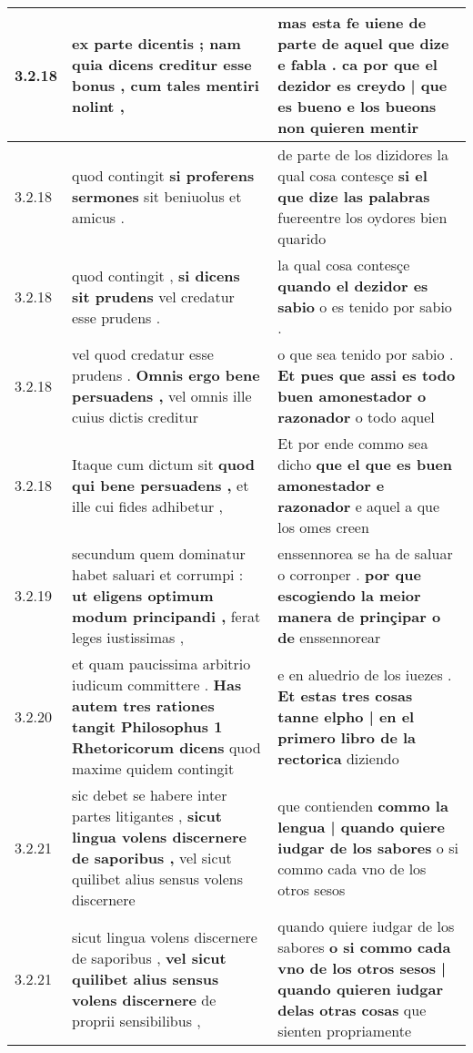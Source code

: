 \begin{tabular}{|p{1cm}|p{6.5cm}|p{6.5cm}|}
3.2.18 & ex parte dicentis ; \textbf{ nam quia dicens creditur esse bonus , } cum tales mentiri nolint , & mas esta fe uiene de parte de aquel que dize e fabla . \textbf{ ca por que el dezidor es creydo | que es bueno } e los bueons non quieren mentir \\\hline
3.2.18 & quod contingit \textbf{ si proferens sermones } sit beniuolus et amicus . & de parte de los dizidores la qual cosa contesçe \textbf{ si el que dize las palabras } fuereentre los oydores bien quarido \\\hline
3.2.18 & quod contingit , \textbf{ si dicens sit prudens } vel credatur esse prudens . & la qual cosa contesçe \textbf{ quando el dezidor es sabio } o es tenido por sabio . \\\hline
3.2.18 & vel quod credatur esse prudens . \textbf{ Omnis ergo bene persuadens , } vel omnis ille cuius dictis creditur & o que sea tenido por sabio . \textbf{ Et pues que assi es todo buen amonestador o razonador } o todo aquel \\\hline
3.2.18 & Itaque cum dictum sit \textbf{ quod qui bene persuadens , } et ille cui fides adhibetur , & Et por ende commo sea dicho \textbf{ que el que es buen amonestador e razonador } e aquel a que los omes creen \\\hline
3.2.19 & secundum quem dominatur habet saluari et corrumpi : \textbf{ ut eligens optimum modum principandi , } ferat leges iustissimas , & enssennorea se ha de saluar o corronper . \textbf{ por que escogiendo la meior manera de prinçipar o de } enssennorear \\\hline
3.2.20 & et quam paucissima arbitrio iudicum committere . \textbf{ Has autem tres rationes tangit Philosophus 1 Rhetoricorum dicens } quod maxime quidem contingit & e en aluedrio de los iuezes . \textbf{ Et estas tres cosas tanne elpho | en el primero libro de la rectorica } diziendo \\\hline
3.2.21 & sic debet se habere inter partes litigantes , \textbf{ sicut lingua volens discernere de saporibus , } vel sicut quilibet alius sensus volens discernere & que contienden \textbf{ commo la lengua | quando quiere iudgar de los sabores } o si commo cada vno de los otros sesos \\\hline
3.2.21 & sicut lingua volens discernere de saporibus , \textbf{ vel sicut quilibet alius sensus volens discernere } de proprii sensibilibus , & quando quiere iudgar de los sabores \textbf{ o si commo cada vno de los otros sesos | quando quieren iudgar delas otras cosas } que sienten propriamente \\\hline

\end{tabular}
